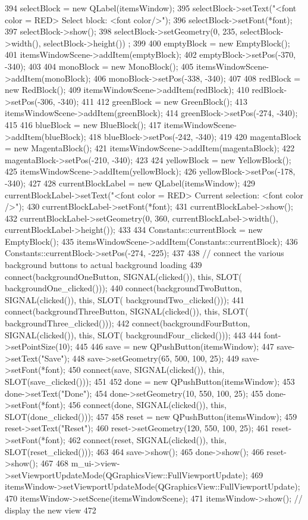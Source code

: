 \begin{DoxyCode}
{394     selectBlock = new QLabel(itemsWindow);
395     selectBlock->setText("<font color = RED> Select block: <font color/>");
396     selectBlock->setFont(*font);
397     selectBlock->show();
398     selectBlock->setGeometry(0, 235, selectBlock->width(), selectBlock->height())
      ;
399 
400     emptyBlock = new EmptyBlock();
401     itemsWindowScene->addItem(emptyBlock);
402     emptyBlock->setPos(-370, -340);
403 
404     monoBlock = new MonoBlock();
405     itemsWindowScene->addItem(monoBlock);
406     monoBlock->setPos(-338, -340);
407 
408     redBlock = new RedBlock();
409     itemsWindowScene->addItem(redBlock);
410     redBlock->setPos(-306, -340);
411 
412     greenBlock = new GreenBlock();
413     itemsWindowScene->addItem(greenBlock);
414     greenBlock->setPos(-274, -340);
415 
416     blueBlock = new BlueBlock();
417     itemsWindowScene->addItem(blueBlock);
418     blueBlock->setPos(-242, -340);
419 
420     magentaBlock = new MagentaBlock();
421     itemsWindowScene->addItem(magentaBlock);
422     magentaBlock->setPos(-210, -340);
423 
424     yellowBlock = new YellowBlock();
425     itemsWindowScene->addItem(yellowBlock);
426     yellowBlock->setPos(-178, -340);
427 
428     currentBlockLabel = new QLabel(itemsWindow);
429     currentBlockLabel->setText("<font color = RED> Current selection: <font color
      />");
430     currentBlockLabel->setFont(*font);
431     currentBlockLabel->show();
432     currentBlockLabel->setGeometry(0, 360, currentBlockLabel->width(), 
      currentBlockLabel->height());
433 
434     Constants::currentBlock = new EmptyBlock();
435     itemsWindowScene->addItem(Constants::currentBlock);
436     Constants::currentBlock->setPos(-274, -225);
437 
438     // connect the various background buttons to actual background loading
439     connect(backgroundOneButton, SIGNAL(clicked()), this, SLOT(
      backgroundOne_clicked()));
440     connect(backgroundTwoButton, SIGNAL(clicked()), this, SLOT(
      backgroundTwo_clicked()));
441     connect(backgroundThreeButton, SIGNAL(clicked()), this, SLOT(
      backgroundThree_clicked()));
442     connect(backgroundFourButton, SIGNAL(clicked()), this, SLOT(
      backgroundFour_clicked()));
443 
444     font->setPointSize(10);
445 
446     save = new QPushButton(itemsWindow);
447     save->setText("Save");
448     save->setGeometry(65, 500, 100, 25);
449     save->setFont(*font);
450     connect(save, SIGNAL(clicked()), this, SLOT(save_clicked()));
451 
452     done = new QPushButton(itemsWindow);
453     done->setText("Done");
454     done->setGeometry(10, 550, 100, 25);
455     done->setFont(*font);
456     connect(done, SIGNAL(clicked()), this, SLOT(done_clicked()));
457 
458     reset = new QPushButton(itemsWindow);
459     reset->setText("Reset");
460     reset->setGeometry(120, 550, 100, 25);
461     reset->setFont(*font);
462     connect(reset, SIGNAL(clicked()), this, SLOT(reset_clicked()));
463 
464     save->show();
465     done->show();
466     reset->show();
467 
468     m_ui->view->setViewportUpdateMode(QGraphicsView::FullViewportUpdate);
469     itemsWindow->setViewportUpdateMode(QGraphicsView::FullViewportUpdate);
470     itemsWindow->setScene(itemsWindowScene);
471     itemsWindow->show();            // display the new view
472 }
\end{DoxyCode}
